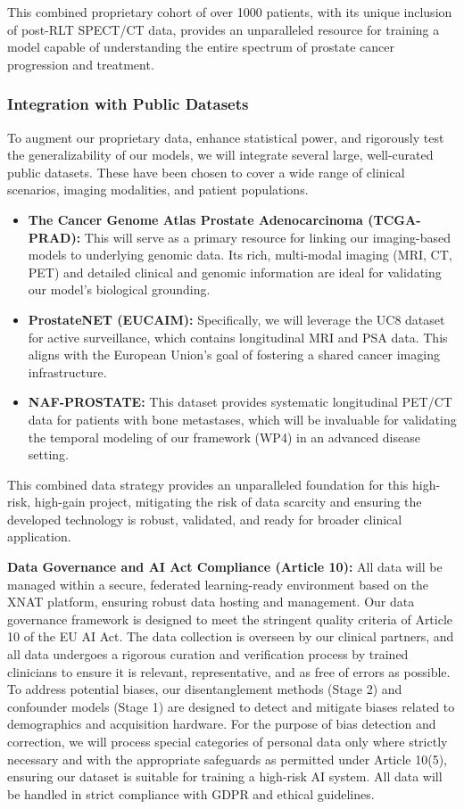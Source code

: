 \documentclass[11pt, a4paper]{article}
\begin{document}
This combined proprietary cohort of over 1000 patients, with its unique inclusion of post-RLT SPECT/CT data, provides an unparalleled resource for training a model capable of understanding the entire spectrum of prostate cancer progression and treatment.

\subsubsection{Integration with Public Datasets}
To augment our proprietary data, enhance statistical power, and rigorously test the generalizability of our models, we will integrate several large, well-curated public datasets. These have been chosen to cover a wide range of clinical scenarios, imaging modalities, and patient populations.
\begin{itemize}
    \item \textbf{The Cancer Genome Atlas Prostate Adenocarcinoma (TCGA-PRAD):} This will serve as a primary resource for linking our imaging-based models to underlying genomic data. Its rich, multi-modal imaging (MRI, CT, PET) and detailed clinical and genomic information are ideal for validating our model’s biological grounding.
    \item \textbf{ProstateNET (EUCAIM):} Specifically, we will leverage the UC8 dataset for active surveillance, which contains longitudinal MRI and PSA data. This aligns with the European Union’s goal of fostering a shared cancer imaging infrastructure.
    \item \textbf{NAF-PROSTATE:} This dataset provides systematic longitudinal PET/CT data for patients with bone metastases, which will be invaluable for validating the temporal modeling of our framework (WP4) in an advanced disease setting.
\end{itemize}
This combined data strategy provides an unparalleled foundation for this high-risk, high-gain project, mitigating the risk of data scarcity and ensuring the developed technology is robust, validated, and ready for broader clinical application.

\textbf{Data Governance and AI Act Compliance (Article 10):} All data will be managed within a secure, federated learning-ready environment based on the XNAT platform, ensuring robust data hosting and management. Our data governance framework is designed to meet the stringent quality criteria of Article 10 of the EU AI Act. The data collection is overseen by our clinical partners, and all data undergoes a rigorous curation and verification process by trained clinicians to ensure it is relevant, representative, and as free of errors as possible. To address potential biases, our disentanglement methods (Stage 2) and confounder models (Stage 1) are designed to detect and mitigate biases related to demographics and acquisition hardware. For the purpose of bias detection and correction, we will process special categories of personal data only where strictly necessary and with the appropriate safeguards as permitted under Article 10(5), ensuring our dataset is suitable for training a high-risk AI system. All data will be handled in strict compliance with GDPR and ethical guidelines.
\end{document}
